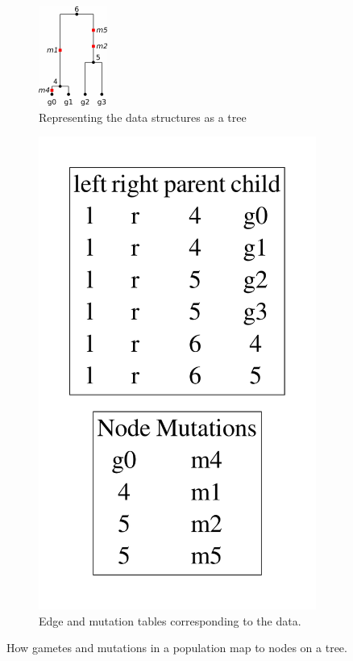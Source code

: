 \documentclass{article}
\begin{document}
\begin{figure}[!h]
\begin{subfigure}[b]{0.25\textwidth}
        \centering
        \includegraphics[scale=1.5]{figs/tree}
        \caption{\label{sfig:tree}Representing the data structures as a tree}
    \end{subfigure}
    \begin{subfigure}[b]{0.25\textwidth}
        \centering
        \includegraphics[scale=0.2]{figs/tables}
        \caption{\label{sfig:tables}Edge and mutation tables corresponding to the data.}
    \end{subfigure}
    \caption{\label{fig:datatree}How gametes and mutations in a population map to nodes on a tree.}
\end{figure}
\newpage


\end{document}
